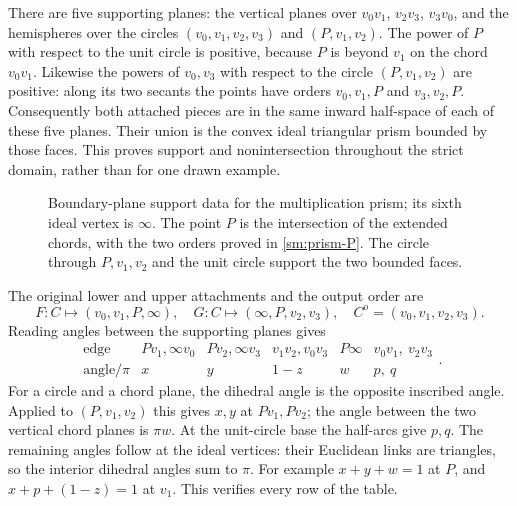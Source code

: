 There are five supporting planes: the vertical planes over
$v_0v_1$, $v_2v_3$, $v_3v_0$, and the hemispheres over the
circles $(v_0,v_1,v_2,v_3)$ and $(P,v_1,v_2)$.
The power of $P$ with respect to the unit circle is positive,
because $P$ is beyond $v_1$ on the chord $v_0v_1$.
Likewise the powers of $v_0,v_3$ with respect to the circle
$(P,v_1,v_2)$ are positive: along its two secants the points
have orders $v_0,v_1,P$ and $v_3,v_2,P$.
Consequently both attached pieces are in the same inward
half-space of each of these five planes. Their union is the
convex ideal triangular prism bounded by those faces.
This proves support and nonintersection throughout the strict
domain, rather than for one drawn example.

\begin{figure}[ht]
\centering
\caption{Boundary-plane support data for the multiplication
prism; its sixth ideal vertex is $\infty$. The point $P$ is
the intersection of the extended chords, with the two orders
proved in \eqref{sm:prism-P}. The circle through $P,v_1,v_2$
and the unit circle support the two bounded faces.}
\label{sm:prism-figure}
\end{figure}

The original lower and upper attachments and the output order are
\begin{equation}\label{sm:stack-map}
 F:C\mapsto(v_0,v_1,P,\infty),\quad
 G:C\mapsto(\infty,P,v_2,v_3),\quad
 C^o=(v_0,v_1,v_2,v_3).
\end{equation}
Reading angles between the supporting planes gives
\begin{equation}\label{sm:prism-angles}
\begin{array}{c|ccccc}
\text{edge}&Pv_1,\infty v_0&Pv_2,\infty v_3&
v_1v_2,v_0v_3&P\infty&v_0v_1,\ v_2v_3\\\hline
\text{angle}/\pi&x&y&1-z&w&p,\ q
\end{array}.
\end{equation}
For a circle and a chord plane, the dihedral angle is the
opposite inscribed angle. Applied to $(P,v_1,v_2)$ this gives
$x,y$ at $Pv_1,Pv_2$; the angle between the two vertical chord
planes is $\pi w$. At the unit-circle base the half-arcs give
$p,q$. The remaining angles follow at the ideal vertices:
their Euclidean links are triangles, so the interior dihedral
angles sum to $\pi$. For example $x+y+w=1$ at $P$, and
$x+p+(1-z)=1$ at $v_1$. This verifies every row of the table.

